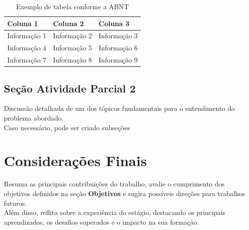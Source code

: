 \begin{table}[ht]
    \centering
    \caption{Exemplo de tabela conforme a ABNT}
    \label{quad:exemplo}
    \begin{tabular}{p{3cm} p{4cm} p{3cm}}
        \hline%
        \textbf{Coluna 1} & \textbf{Coluna 2} & \textbf{Coluna 3} \\
        \hline%
        Informação 1 & Informação 2 & Informação 3 \\
        Informação 4 & Informação 5 & Informação 6 \\
        Informação 7 & Informação 8 & Informação 9 \\
        \hline%
    \end{tabular}
\end{table}



\subsection{ Seção Atividade Parcial 2} \label{sec:definir-tituto-da-secao2}

Discussão detalhada de um dos tópicos fundamentais para o entendimento do problema abordado. \\ Caso necessário, pode ser criado subseções


\section{Considerações Finais} \label{ch:consideracoes-finais}
Resuma as principais contribuições do trabalho, avalie o cumprimento dos objetivos definidos na seção \textbf{Objetivos} e sugira possíveis direções para trabalhos futuros.\\
Além disso, reflita sobre a experiência do estágio, destacando os principais aprendizados, os desafios superados e o impacto na sua formação. 